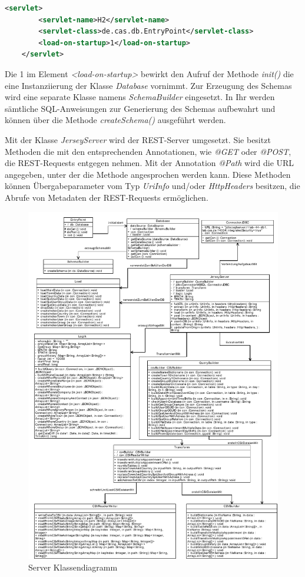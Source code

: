 \begin{lstlisting}[language=XML]
	<servlet>
		<servlet-name>H2</servlet-name>
		<servlet-class>de.cas.db.EntryPoint</servlet-class>
		<load-on-startup>1</load-on-startup>
	</servlet>
\end{lstlisting}

Die 1 im Element \textit{<load-on-startup>} bewirkt den Aufruf der Methode \textit{init()} die eine Instanziierung der Klasse \textit{Database} vornimmt. Zur Erzeugung des Schemas wird eine separate Klasse namens \textit{SchemaBuilder} eingesetzt. In Ihr werden sämtliche SQL-Anweisungen zur Generierung des Schemas aufbewahrt und können über die Methode \textit{createSchema()} ausgeführt werden.

Mit der Klasse \textit{JerseyServer} wird der REST-Server umgesetzt. Sie besitzt Methoden die mit den entsprechenden Annotationen, wie \textit{@GET} oder \textit{@POST}, die REST-Requests entgegen nehmen. Mit der Annotation \textit{@Path} wird die URL angegeben, unter der die Methode angesprochen werden kann. Diese Methoden können Übergabeparameter vom Typ \textit{UriInfo} und/oder \textit{HttpHeaders} besitzen, die Abrufe von Metadaten der REST-Requests ermöglichen. 

\begin{figure}[htbp]
\begin{center}
\includegraphics[width=1.0\textwidth]{pics/ServerKlassendiagramm.pdf}
\caption{Server Klassendiagramm}
\label{umsetzung_klassendiagramm_server}
\end{center}
\end{figure}

